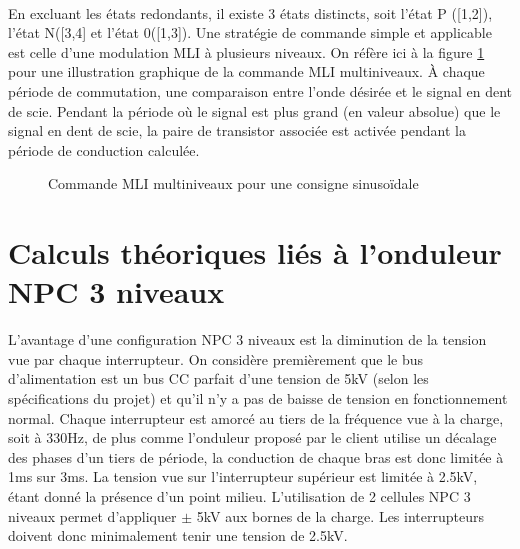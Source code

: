 \paragraph{}En excluant les états redondants, il existe 3 états distincts, soit l'état P ([1,2]), l'état N([3,4] et l'état 0([1,3]). Une stratégie de commande simple et applicable est celle d'une modulation MLI à plusieurs niveaux. On réfère ici à la figure \ref{fig_MLI_ML} pour une illustration graphique de la commande MLI multiniveaux. À chaque période de commutation, une comparaison entre l'onde désirée et le signal en dent de scie. Pendant la période où le signal est plus grand (en valeur absolue) que le signal en dent de scie, la paire de transistor associée est activée pendant la période de conduction calculée. 

\begin{figure}[htb]

\caption{Commande MLI multiniveaux pour une consigne sinusoïdale}
\label{fig_MLI_ML}
\end{figure}

\section{Calculs théoriques liés à l'onduleur NPC 3 niveaux}
L'avantage d'une configuration NPC 3 niveaux est la diminution de la tension vue par chaque interrupteur. On considère premièrement que le bus d'alimentation est un bus CC parfait d'une tension de 5kV (selon les spécifications du projet) et qu'il n'y a pas de baisse de tension en fonctionnement normal. Chaque interrupteur est amorcé au tiers de la fréquence vue à la charge, soit à 330Hz, de plus comme l'onduleur proposé par le client utilise un décalage des phases d'un tiers de période, la conduction de chaque bras est donc limitée à 1ms sur 3ms. La tension vue sur l'interrupteur supérieur est limitée à 2.5kV, étant donné la présence d'un point milieu. L'utilisation de 2 cellules NPC 3 niveaux permet d'appliquer $\pm$ 5kV aux bornes de la charge. Les interrupteurs doivent donc minimalement tenir une tension de 2.5kV. 

